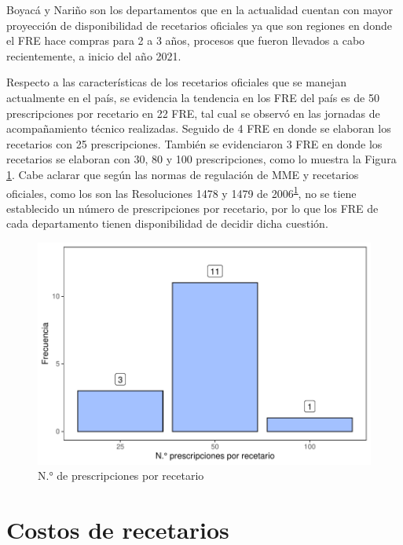 \documentclass[
]{book}
\begin{document}
Boyacá y Nariño son los departamentos que en la actualidad cuentan con mayor proyección de disponibilidad de recetarios oficiales ya que son regiones en donde el FRE hace compras para 2 a 3 años, procesos que fueron llevados a cabo recientemente, a inicio del año 2021.

Respecto a las características de los recetarios oficiales que se manejan actualmente en el país, se evidencia la tendencia en los FRE del país es de 50 prescripciones por recetario en 22 FRE, tal cual se observó en las jornadas de acompañamiento técnico realizadas. Seguido de 4 FRE en donde se elaboran los recetarios con 25 prescripciones. También se evidenciaron 3 FRE en donde los recetarios se elaboran con 30, 80 y 100 prescripciones, como lo muestra la Figura \ref{fig:existenciaRecetarios4}. Cabe aclarar que según las normas de regulación de MME y recetarios oficiales, como los son las Resoluciones 1478 y 1479 de 2006\textsuperscript{\protect\hyperlink{ref-MSPS1479-2006}{1}}, no se tiene establecido un número de prescripciones por recetario, por lo que los FRE de cada departamento tienen disponibilidad de decidir dicha cuestión.

\begin{figure}
\includegraphics[width=0.85\linewidth]{InformeFinal_files/figure-latex/existenciaRecetarios4-1} \caption{N.° de prescripciones por recetario}\label{fig:existenciaRecetarios4}
\end{figure}

\hypertarget{costos-de-recetarios}{%
\section{Costos de recetarios}\label{costos-de-recetarios}}

\end{document}
